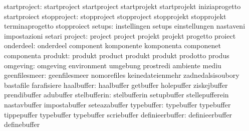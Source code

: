                     startproject: startproject                     startproject
                                  startprojekt                     startprojekt
                                  iniziaprogetto                   startproiect
                     stopproject: stopproject                      stopproject
                                  stopprojekt                      stopprojekt
                                  terminaprogetto                  stopproiect
                          setups: instellingen                     setups
                                  einstellungen                    nastaveni
                                  impostazioni                     setari
                         project: project                          project
                                  projekt                          projekt
                                  progetto                         proiect
                       onderdeel: onderdeel                        component
                                  komponente                       komponenta
                                  componenet                       componenta
                         produkt: produkt                          product
                                  produkt                          produkt
                                  prodotto                         produs
                        omgeving: omgeving                         environment
                                  umgebung                         prostredi
                                  ambiente                         mediu
                   geenfilesmeer: geenfilesmeer                    nomorefiles
                                  keinedateienmehr                 zadnedalsisoubory
                                  bastafile                        farafisiere
                      haalbuffer: haalbuffer                       getbuffer
                                  holepuffer                       ziskejbuffer
                                  prendibuffer                     adubuffer
                    stelbufferin: stelbufferin                     setupbuffer
                                  stellepufferein                  nastavbuffer
                                  impostabuffer                    seteazabuffer
                      typebuffer: typebuffer                       typebuffer
                                  tippepuffer                      typebuffer
                                  typebuffer                       scriebuffer %
                 definieerbuffer: definieerbuffer                  definebuffer
